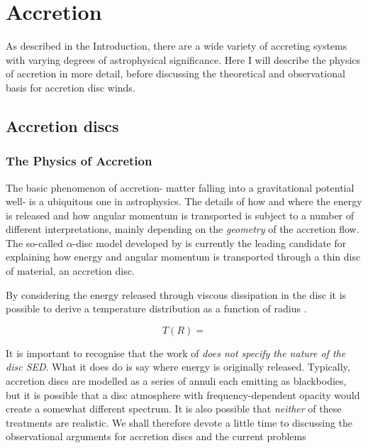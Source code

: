 \chapter{Accretion}


As described in the Introduction, there are a wide variety of accreting systems
with varying degrees of astrophysical significance. Here I will describe the 
physics of accretion in more detail, before discussing the theoretical and observational 
basis for accretion disc winds. 



\section{Accretion discs}

\subsection{The Physics of Accretion}

The basic phenomenon of accretion- matter falling into a gravitational potential well- 
is a ubiquitous one in astrophysics. The details of how and where the energy is released
and how angular momentum is transported is subject to a number of different 
interpretations, mainly depending on the {\em geometry} of the accretion flow.
The so-called $\alpha$-disc model developed by \cite{shakurasunyaev1973} is
currently the leading candidate for explaining how energy and angular momentum
is transported through a thin disc of material, an accretion disc.

By considering the energy released through viscous dissipation 
in the disc it is possible to derive a temperature distribution as a function of 
radius \citep{shakurasunyaev1973, fkrbook}. 

\begin{equation}
T(R) =  
\end{equation}

It is important to recognise that the work of \cite{shakurasunyaev1973} 
{\sl does not specify the nature of the disc SED}. What it does do is 
say where energy is originally released. Typically,
accretion discs are modelled as a series of annuli each emitting 
as blackbodies, but it is possible that a disc atmosphere with frequency-dependent
opacity would create a somewhat different spectrum. It is also possible that {\em neither} of these 
treatments are realistic. We shall therefore devote a little time to discussing
the observational arguments for accretion discs and the current problems 


